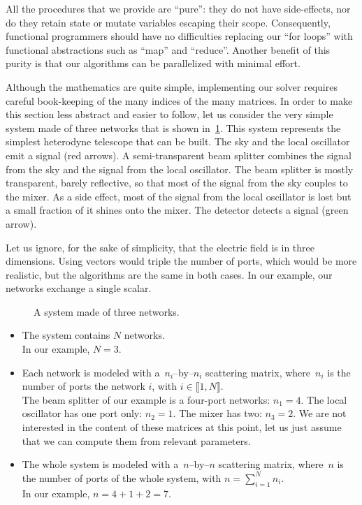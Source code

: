\begin{refsection}
All the procedures that we provide are ``pure'': they do not have side-effects, nor do they retain state or mutate variables escaping their scope.
Consequently, functional programmers should have no difficulties replacing our ``for loops'' with functional abstractions such as ``map'' and ``reduce''.
Another benefit of this purity is that our algorithms can be parallelized with minimal effort.

Although the mathematics are quite simple, implementing our solver requires careful book-keeping of the many indices of the many matrices.
In order to make this section less abstract and easier to follow, let us consider the very simple system made of three networks that is shown in~\cref{fig:implementation_0}.
This system represents the simplest heterodyne telescope that can be built.
The sky and the local oscillator emit a signal (red arrows).
A semi-transparent beam splitter combines the signal from the sky and the signal from the local oscillator.
The beam splitter is mostly transparent, barely reflective, so that most of the signal from the sky couples to the mixer.
As a side effect, most of the signal from the local oscillator is lost but a small fraction of it shines onto the mixer.
The detector detects a signal (green arrow).

Let us ignore, for the sake of simplicity, that the electric field is in three dimensions.
Using vectors would triple the number of ports, which would be more realistic, but the algorithms are the same in both cases.
In our example, our networks exchange a single scalar.

\begin{figure}
    \centering
    
    \caption{A system made of three networks.}
    \label{fig:implementation_0}
\end{figure}

\begin{itemize}
    \item 
The system contains $N$ networks.
\\In our example, $N=3$.
    \item 
Each network is modeled with a~$n_i$--by--$n_i$ scattering matrix, where~$n_i$ is the number of ports the network $i$, with $i \in \llbracket 1, N \rrbracket$.
\\
The beam splitter of our example is a four-port networks: $n_1=4$.
The local oscillator has one port only: $n_2=1$.
The mixer has two: $n_3=2$.
We are not interested in the content of these matrices at this point, let us just assume that we can compute them from relevant parameters.
    \item 
The whole system is modeled with a~$n$--by--$n$ scattering matrix, where~$n$ is the number of ports of the whole system, with $n = \sum_{i=1}^N n_i$.
\\
In our example, $n=4+1+2=7$.
\end{itemize}


\end{refsection}
